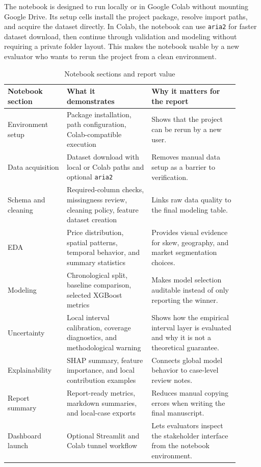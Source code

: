 \documentclass[12pt,a4paper]{article}
\begin{document}
The notebook is designed to run locally or in Google Colab without mounting Google Drive. Its setup cells install the project package, resolve import paths, and acquire the dataset directly. In Colab, the notebook can use \texttt{aria2} for faster dataset download, then continue through validation and modeling without requiring a private folder layout. This makes the notebook usable by a new evaluator who wants to rerun the project from a clean environment.

\begin{table}[H]
\centering
\caption{Notebook sections and report value}
\label{tab:notebook_sections}
\begin{tabular}{p{0.23\linewidth}p{0.33\linewidth}p{0.34\linewidth}}
\toprule
\textbf{Notebook section} & \textbf{What it demonstrates} & \textbf{Why it matters for the report}\\
\midrule
Environment setup & Package installation, path configuration, Colab-compatible execution & Shows that the project can be rerun by a new user.\\
Data acquisition & Dataset download with local or Colab paths and optional \texttt{aria2} & Removes manual data setup as a barrier to verification.\\
Schema and cleaning & Required-column checks, missingness review, cleaning policy, feature dataset creation & Links raw data quality to the final modeling table.\\
EDA & Price distribution, spatial patterns, temporal behavior, and summary statistics & Provides visual evidence for skew, geography, and market segmentation choices.\\
Modeling & Chronological split, baseline comparison, selected XGBoost metrics & Makes model selection auditable instead of only reporting the winner.\\
Uncertainty & Local interval calibration, coverage diagnostics, and methodological warning & Shows how the empirical interval layer is evaluated and why it is not a theoretical guarantee.\\
Explainability & SHAP summary, feature importance, and local contribution examples & Connects global model behavior to case-level review notes.\\
Report summary & Report-ready metrics, markdown summaries, and local-case exports & Reduces manual copying errors when writing the final manuscript.\\
Dashboard launch & Optional Streamlit and Colab tunnel workflow & Lets evaluators inspect the stakeholder interface from the notebook environment.\\
\bottomrule
\end{tabular}
\end{table}
\end{document}
